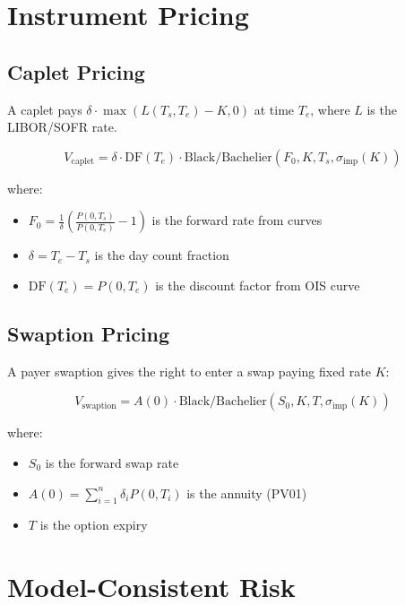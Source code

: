 \documentclass[12pt,a4paper]{report}
\begin{document}
\section{Instrument Pricing}

\subsection{Caplet Pricing}

A caplet pays $\delta \cdot \max(L(T_s, T_e) - K, 0)$ at time $T_e$, where $L$ is the LIBOR/SOFR rate.

\begin{equation}
    V_{\text{caplet}} = \delta \cdot \text{DF}(T_e) \cdot \text{Black/Bachelier}(F_0, K, T_s, \sigma_{\text{imp}}(K))
\end{equation}

where:
\begin{itemize}[leftmargin=1.2em,itemsep=0.1em]
    \item $F_0 = \frac{1}{\delta}\left(\frac{P(0,T_s)}{P(0,T_e)} - 1\right)$ is the forward rate from curves
    \item $\delta = T_e - T_s$ is the day count fraction
    \item $\text{DF}(T_e) = P(0,T_e)$ is the discount factor from OIS curve
\end{itemize}

\subsection{Swaption Pricing}

A payer swaption gives the right to enter a swap paying fixed rate $K$:

\begin{equation}
    V_{\text{swaption}} = A(0) \cdot \text{Black/Bachelier}(S_0, K, T, \sigma_{\text{imp}}(K))
\end{equation}

where:
\begin{itemize}[leftmargin=1.2em,itemsep=0.1em]
    \item $S_0$ is the forward swap rate
    \item $A(0) = \sum_{i=1}^{n} \delta_i P(0, T_i)$ is the annuity (PV01)
    \item $T$ is the option expiry
\end{itemize}

\section{Model-Consistent Risk}
\end{document}
